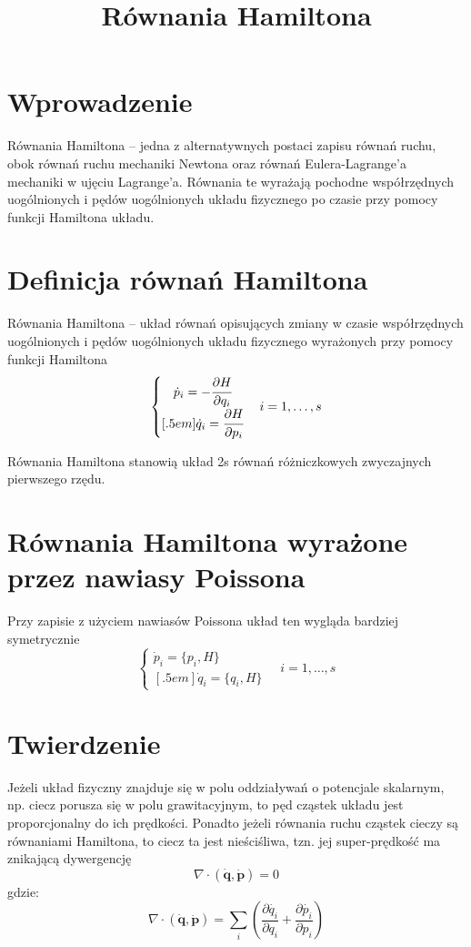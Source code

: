 \documentclass{article}
\begin{document}
\title{Równania Hamiltona}
\maketitle

\section*{Wprowadzenie}
Równania Hamiltona – jedna z alternatywnych postaci zapisu równań ruchu, obok równań ruchu mechaniki Newtona oraz równań Eulera-Lagrange’a mechaniki w ujęciu Lagrange’a. Równania te wyrażają pochodne współrzędnych uogólnionych i pędów uogólnionych układu fizycznego po czasie przy pomocy funkcji Hamiltona układu. 

\section*{Definicja równań Hamiltona}
Równania Hamiltona – układ równań opisujących zmiany w czasie współrzędnych uogólnionych i pędów uogólnionych układu fizycznego wyrażonych przy pomocy funkcji Hamiltona 
\begin{displaymath}
\left\{{\begin{matrix}{\dot {p}}_{i}=-{\cfrac {\partial H}{\partial q_{i}}}\\{[.5em]}{\dot {q}}_{i}={\cfrac {\partial H}{\partial p_{i}}}\end{matrix}}\right.\quad i=1,\dots ,s
\end{displaymath}

Równania Hamiltona stanowią układ 2s równań różniczkowych zwyczajnych pierwszego rzędu. 

\section*{Równania Hamiltona wyrażone przez nawiasy Poissona}
Przy zapisie z użyciem nawiasów Poissona układ ten wygląda bardziej symetrycznie 
\begin{equation*}
\left\{{\begin{matrix}{\dot {p}}_{i}=\{p_{i},H\}\\{[.5em]}{\dot {q}}_{i}=\{q_{i},H\}\end{matrix}}\right.\quad i=1,\dots ,s
\end{equation*}

\section*{Twierdzenie}
Jeżeli układ fizyczny znajduje się w polu oddziaływań o potencjale skalarnym, np. ciecz porusza się w polu grawitacyjnym, to pęd cząstek układu jest proporcjonalny do ich prędkości. Ponadto jeżeli równania ruchu cząstek cieczy są równaniami Hamiltona, to ciecz ta jest nieściśliwa, tzn. jej super-prędkość ma znikającą dywergencję
$$ \nabla \cdot ({\dot {\mathbf {q} }},{\dot {\mathbf {p} }})=0 $$
gdzie:
\[ \nabla \cdot ({\dot {\mathbf {q} }},{\dot {\mathbf {p} }})=\sum _{i}\left({\frac {\partial {\dot {q_{i}}}}{\partial q_{i}}}+{\frac {\partial {\dot {p_{i}}}}{\partial p_{i}}}\right) \]
\end{document}
